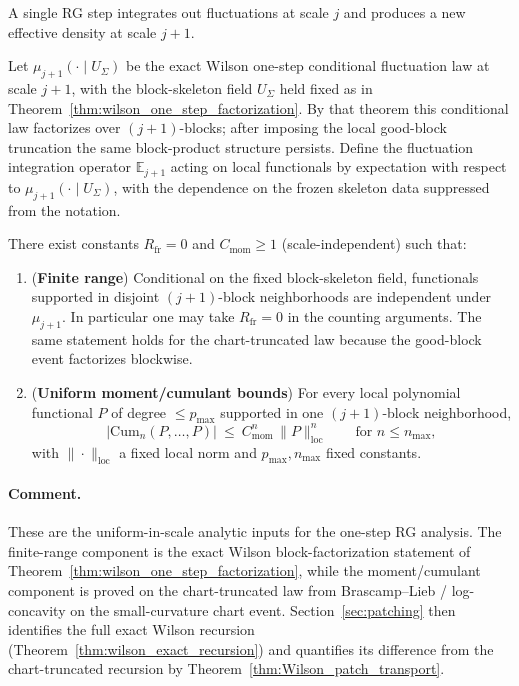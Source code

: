 A single RG step integrates out fluctuations at scale $j$ and produces a new effective density at scale $j+1$.

Let $\mu_{j+1}(\cdot\mid U_{\Sigma})$ be the exact Wilson one-step conditional fluctuation law at scale $j+1$, with the block-skeleton field $U_{\Sigma}$ held fixed as in Theorem~\ref{thm:wilson_one_step_factorization}.
By that theorem this conditional law factorizes over $(j+1)$-blocks; after imposing the local good-block truncation the same block-product structure persists.
Define the fluctuation integration operator $\mathbb E_{j+1}$ acting on local functionals by expectation with respect to $\mu_{j+1}(\cdot\mid U_{\Sigma})$, with the dependence on the frozen skeleton data suppressed from the notation.

\begin{proposition}\label{ass:fluctuation_bounds}
There exist constants $R_{\mathrm{fr}}=0$ and $C_{\mathrm{mom}}\ge 1$ (scale-independent) such that:
\begin{enumerate}[label=(F\arabic*)]
\item (\textbf{Finite range}) Conditional on the fixed block-skeleton field, functionals supported in disjoint $(j+1)$-block neighborhoods are independent under $\mu_{j+1}$. In particular one may take $R_{\mathrm{fr}}=0$ in the counting arguments.  The same statement holds for the chart-truncated law because the good-block event factorizes blockwise.
\item (\textbf{Uniform moment/cumulant bounds}) For every local polynomial functional $P$ of degree $\le p_{\max}$ supported in one $(j+1)$-block neighborhood,
\[
\big|\mathrm{Cum}_n(P,\dots,P)\big|\ \le\ C_{\mathrm{mom}}^{n}\,\|P\|_{\mathrm{loc}}^{n}
\qquad\text{for }n\le n_{\max},
\]
with $\|\cdot\|_{\mathrm{loc}}$ a fixed local norm and $p_{\max},n_{\max}$ fixed constants.
\end{enumerate}
\end{proposition}

\paragraph{Comment.}
These are the uniform-in-scale analytic inputs for the one-step RG analysis.  The finite-range component is the exact Wilson block-factorization statement of Theorem~\ref{thm:wilson_one_step_factorization}, while the moment/cumulant component is proved on the chart-truncated law from Brascamp--Lieb / log-concavity on the small-curvature chart event.  Section~\ref{sec:patching} then identifies the full exact Wilson recursion (Theorem~\ref{thm:wilson_exact_recursion}) and quantifies its difference from the chart-truncated recursion by Theorem~\ref{thm:Wilson_patch_transport}.

